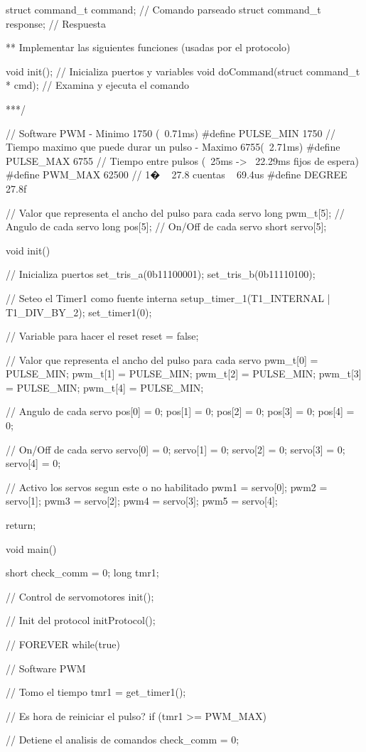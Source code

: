 {\begin{verbatimtab}
struct command_t command; 	// Comando parseado
struct command_t response; 	// Respuesta

** Implementar las siguientes funciones (usadas por el protocolo)

void init(); // Inicializa puertos y variables
void doCommand(struct command_t * cmd); // Examina y ejecuta el comando

***/

// Software PWM - Minimo 1750 (~0.71ms)
#define PULSE_MIN	1750
// Tiempo maximo que puede durar un pulso - Maximo 6755(~2.71ms)
#define PULSE_MAX	6755
// Tiempo entre pulsos (~25ms -> ~22.29ms fijos de espera)
#define PWM_MAX		62500
// 1� ~ 27.8 cuentas ~ 69.4us
#define DEGREE		27.8f

// Valor que representa el ancho del pulso para cada servo
long pwm_t[5];
// Angulo de cada servo
long pos[5];
// On/Off de cada servo
short servo[5];

void init()
{
	// Inicializa puertos
	set_tris_a(0b11100001);
	set_tris_b(0b11110100);

	// Seteo el Timer1 como fuente interna
	setup_timer_1(T1_INTERNAL | T1_DIV_BY_2);
	set_timer1(0);

	// Variable para hacer el reset
	reset = false;

	// Valor que representa el ancho del pulso para cada servo
	pwm_t[0] = PULSE_MIN;
	pwm_t[1] = PULSE_MIN;
	pwm_t[2] = PULSE_MIN;
	pwm_t[3] = PULSE_MIN;
	pwm_t[4] = PULSE_MIN;
	
	// Angulo de cada servo
	pos[0] = 0;
	pos[1] = 0;
	pos[2] = 0;
	pos[3] = 0;
	pos[4] = 0;
	
	// On/Off de cada servo
	servo[0] = 0;
	servo[1] = 0;
	servo[2] = 0;
	servo[3] = 0;
	servo[4] = 0;
	
	// Activo los servos segun este o no habilitado
	pwm1 = servo[0];
	pwm2 = servo[1];
	pwm3 = servo[2];
	pwm4 = servo[3];
	pwm5 = servo[4];
	
	return;	
}	

void main()
{
	short check_comm = 0;
	long tmr1;
	
	// Control de servomotores
	init();

	// Init del protocol
	initProtocol();


	// FOREVER
	while(true)
	{
		// Software PWM

		// Tomo el tiempo
		tmr1 = get_timer1();
		
		// Es hora de reiniciar el pulso?
		if (tmr1 >= PWM_MAX)
		{
			// Detiene el analisis de comandos
			check_comm = 0;
			
}}}
\end{verbatimtab}}
